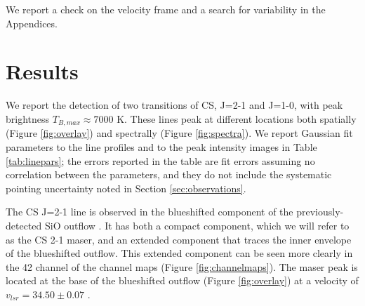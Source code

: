 \documentclass[twocolumn]{aastex62}
\begin{document}
We report a check on the velocity frame and a search for variability in the
Appendices.


\section{Results}
We report the detection of two transitions of CS, J=2-1 and J=1-0, with
peak brightness $T_{B,max}\approx7000$ K.
These lines peak at different locations both spatially (Figure
\ref{fig:overlay}) and spectrally (Figure \ref{fig:spectra}).
We report Gaussian fit parameters to the line profiles and to the peak intensity
images in Table \ref{tab:linepars}; the errors reported in the table are fit
errors assuming no correlation between the parameters, and they do not include
the systematic pointing uncertainty noted in Section \ref{sec:observations}.

The CS J=2-1 line is observed in the blueshifted component of the
previously-detected SiO outflow \citep{Goddi2018a}.
It has both a compact component, which we will refer to as the CS 2-1 maser,
and an extended component that traces the inner envelope of the blueshifted
outflow.  This extended component can be seen more clearly in the 42 \kms
channel of the channel maps (Figure \ref{fig:channelmaps}).  The maser
peak is located at the base of the blueshifted outflow (Figure
\ref{fig:overlay}) at a velocity of $v_{lsr}=34.50\pm0.07$ \kms.
\end{document}
